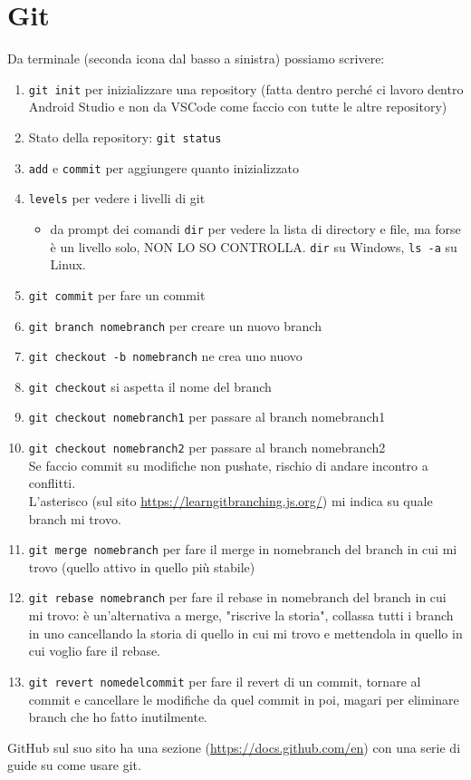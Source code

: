 \section{Git}
\par Da terminale (seconda icona dal basso a sinistra) possiamo scrivere:
\begin{enumerate}
    \item \texttt{git init} per inizializzare una repository (fatta dentro perché ci lavoro dentro Android Studio e non da VSCode come faccio con tutte le altre repository) 
    \item Stato della repository: \texttt{git status}
    \item \texttt{add} e \texttt{commit} per aggiungere quanto inizializzato
    \item \texttt{levels} per vedere i livelli di git
    \begin{itemize}
        \item da prompt dei comandi \texttt{dir} per vedere la lista di directory e file, ma forse è un livello solo, NON LO SO CONTROLLA. \texttt{dir} su Windows, \texttt{ls -a} su Linux.
    \end{itemize}
    \item \texttt{git commit} per fare un commit
    \item \texttt{git branch nomebranch} per creare un nuovo branch
    \item \texttt{git checkout -b nomebranch} ne crea uno nuovo
    \item \texttt{git checkout} si aspetta il nome del branch
    \item \texttt{git checkout nomebranch1} per passare al branch nomebranch1
    \item \texttt{git checkout nomebranch2} per passare al branch nomebranch2\\
    Se faccio commit su modifiche non pushate, rischio di andare incontro a conflitti.\\
    L'asterisco (sul sito \url{https://learngitbranching.js.org/}) mi indica su quale branch mi trovo.
    \item \texttt{git merge nomebranch} per fare il merge in nomebranch del branch in cui mi trovo (quello attivo in quello più stabile)
    \item \texttt{git rebase nomebranch} per fare il rebase in nomebranch del branch in cui mi trovo: è un'alternativa a merge, "riscrive la storia", collassa tutti i branch in uno cancellando la storia di quello in cui mi trovo e mettendola in quello in cui voglio fare il rebase.
    \item \texttt{git revert nomedelcommit} per fare il revert di un commit, tornare al commit e cancellare le modifiche da quel commit in poi, magari per eliminare branch che ho fatto inutilmente.
\end{enumerate}
\par GitHub sul suo sito ha una sezione (\url{https://docs.github.com/en}) con una serie di guide su come usare git.


